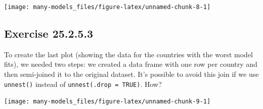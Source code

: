 \documentclass[]{book}
\newenvironment{Shaded}{\begin{snugshade}}{\end{snugshade}}
\newcommand{\DataTypeTok}[1]{\textcolor[rgb]{0.13,0.29,0.53}{#1}}
\newcommand{\FloatTok}[1]{\textcolor[rgb]{0.00,0.00,0.81}{#1}}
\newcommand{\KeywordTok}[1]{\textcolor[rgb]{0.13,0.29,0.53}{\textbf{#1}}}
\newcommand{\NormalTok}[1]{#1}
\newcommand{\OperatorTok}[1]{\textcolor[rgb]{0.81,0.36,0.00}{\textbf{#1}}}
\newcommand{\StringTok}[1]{\textcolor[rgb]{0.31,0.60,0.02}{#1}}
\theoremstyle{plain}
\theoremstyle{remark}
\begin{document}
\begin{center}\texttt{[image: many-models\_files/figure-latex/unnamed-chunk-8-1]} \end{center}

\hypertarget{exercise-25.2.5.3}{%
\subsection*{\texorpdfstring{Exercise {25.2.5.3}}{Exercise 25.2.5.3}}\label{exercise-25.2.5.3}}

To create the last plot (showing the data for the countries with the worst model fits),
we needed two steps: we created a data frame with one row per country and
then semi-joined it to the original dataset.
It's possible to avoid this join if we use \texttt{unnest()} instead of \texttt{unnest(.drop\ =\ TRUE)}. How?

\begin{Shaded}
\end{Shaded}

\begin{center}\texttt{[image: many-models\_files/figure-latex/unnamed-chunk-9-1]} \end{center}
\end{document}
